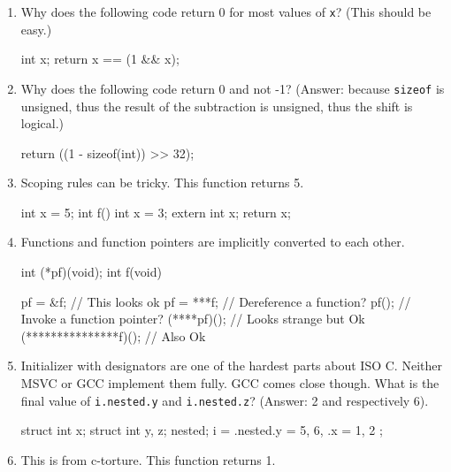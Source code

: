 \documentclass{article}
\def\t#1{{\tt #1}}
\begin{document}
\begin{enumerate}

\item Why does the following code return 0 for most values of \t{x}? (This
should be easy.)

\begin{cilcode}[local]
  int x;
  return x == (1 && x);
\end{cilcode}

\item Why does the following code return 0 and not -1? (Answer: because
\t{sizeof} is unsigned, thus the result of the subtraction is unsigned, thus
the shift is logical.)

\begin{cilcode}[local]
 return ((1 - sizeof(int)) >> 32);
\end{cilcode}

\item Scoping rules can be tricky. This function returns 5.

\begin{cilcode}[global]
int x = 5;
int f() {
  int x = 3;
  {
    extern int x;
    return x;
  }
}
\end{cilcode}

\item Functions and function pointers are implicitly converted to each other. 

\begin{cilcode}[global]
int (*pf)(void);
int f(void) {

   pf = &f; // This looks ok
   pf = ***f; // Dereference a function?
   pf(); // Invoke a function pointer?     
   (****pf)();  // Looks strange but Ok
   (***************f)(); // Also Ok             
}
\end{cilcode}

\item Initializer with designators are one of the hardest parts about ISO C.
Neither MSVC or GCC implement them fully. GCC comes close though. What is the
final value of \t{i.nested.y} and \t{i.nested.z}? (Answer: 2 and respectively
6). 

\begin{cilcode}[global]
struct { 
   int x; 
   struct { 
       int y, z; 
   } nested;
} i = { .nested.y = 5, 6, .x = 1, 2 };               
\end{cilcode}

\item This is from c-torture. This function returns 1.


\end{enumerate}
\end{document}
